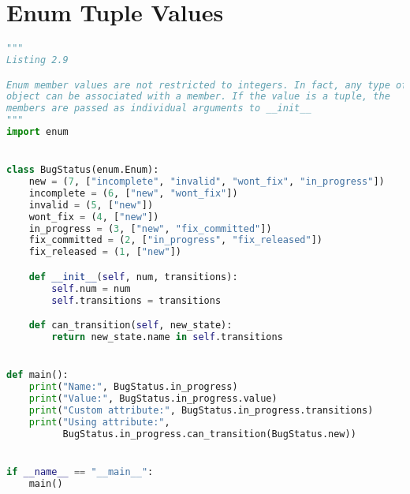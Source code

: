 \documentclass[a4paper,landscape]{report}
\begin{document}
\section{Enum Tuple Values}
\begin{lstlisting}[language=Python]
"""
Listing 2.9

Enum member values are not restricted to integers. In fact, any type of
object can be associated with a member. If the value is a tuple, the
members are passed as individual arguments to __init__
"""
import enum


class BugStatus(enum.Enum):
    new = (7, ["incomplete", "invalid", "wont_fix", "in_progress"])
    incomplete = (6, ["new", "wont_fix"])
    invalid = (5, ["new"])
    wont_fix = (4, ["new"])
    in_progress = (3, ["new", "fix_committed"])
    fix_committed = (2, ["in_progress", "fix_released"])
    fix_released = (1, ["new"])

    def __init__(self, num, transitions):
        self.num = num
        self.transitions = transitions

    def can_transition(self, new_state):
        return new_state.name in self.transitions


def main():
    print("Name:", BugStatus.in_progress)
    print("Value:", BugStatus.in_progress.value)
    print("Custom attribute:", BugStatus.in_progress.transitions)
    print("Using attribute:",
          BugStatus.in_progress.can_transition(BugStatus.new))


if __name__ == "__main__":
    main()

\end{lstlisting}
\end{document}
